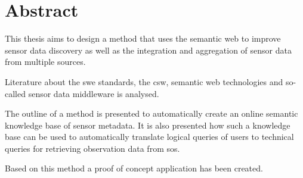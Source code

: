 
\chapter*{Abstract}


This thesis aims to design a method that uses the semantic web to improve sensor data discovery as well as the integration and aggregation of sensor data from multiple sources.

Literature about the \acf{swe} standards, the \acf{csw}, semantic web technologies and so-called sensor data middleware is analysed. 

The outline of a method is presented to automatically create an online semantic knowledge base of sensor metadata. It is also presented how such a knowledge base can be used to automatically translate logical queries of users to technical queries for retrieving observation data from \acf{sos}.  

Based on this method a proof of concept application has been created. 

